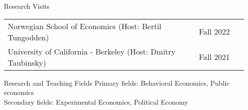 \documentclass{resume} %
\begin{document}
\begin{rSection}{Research Visits}
  \begin{tabular}{ @{} p{0.78\linewidth} >{\raggedleft\arraybackslash}p{0.2\linewidth} }
    Norwegian School of Economics (Host: Bertil Tungodden)  & Fall 2022  \\
  University of California - Berkeley (Host: Dmitry Taubinsky) &  Fall 2021 \\
  \end{tabular}
\end{rSection}

\begin{rSection}{Research and Teaching Fields}
  Primary fields: Behavioral Economics, Public economics \\
  Secondary fields: Experimental Economics, Political Economy
\end{rSection}
\end{document}
